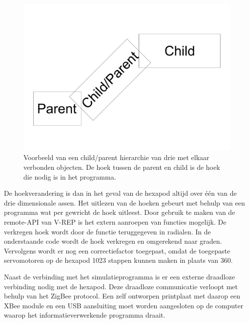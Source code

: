 \documentclass[10pt,a4paper]{article}
\begin{document}
\begin{figure}[h]
    \centering
    \includegraphics[width=1\textwidth]{hierarchi}
    \caption{Voorbeeld van een child/parent hierarchie van drie met elkaar verbonden objecten. De hoek tussen de parent en child is de hoek die nodig is in het programma.}
    \label{fig:hierarchi}
\end{figure}

De hoekverandering is dan in het geval van de hexapod altijd over \'e\'en van de drie dimensionale assen. Het uitlezen van de hoeken gebeurt met behulp van een programma wat per gewricht de hoek uitleest. Door gebruik te maken van de remote-API van V-REP is het extern aanroepen van functies mogelijk. De verkregen hoek wordt door de functie teruggegeven in radialen. In de onderstaande code wordt de hoek verkregen en omgerekend naar graden. Vervolgens wordt er nog een correctiefactor toegepast, omdat de toegepaste servomotoren op de hexapod 1023 stappen kunnen maken in plaats van 360.



Naast de verbinding met het simulatieprogramma is er een externe draadloze verbinding nodig met de hexapod. Deze draadloze communicatie verloopt met behulp van het ZigBee protocol. Een zelf ontworpen printplaat met daarop een XBee module en een USB aansluiting moet worden aangesloten op de computer waarop het informatieverwerkende programma draait.
\end{document}
